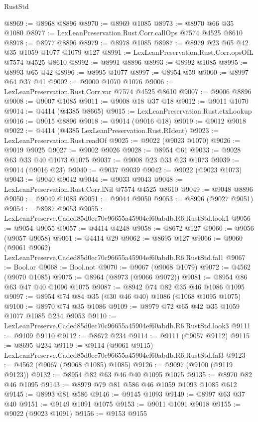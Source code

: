 \begin{lexlean}{RustStd}
\begin{coremodule}
@8969 := @8968 @8896
@8970 := @8969 @1085
@8973 := @8970 @66 @35 @1080
@8977 := LexLeanPreservation.Rust.Corr.callOps @7574 @4525 @8610
@8978 := @8977 @8896
@8979 := @8978 @1085
@8987 := @8979 @23 @65 @42 @35 @1059 @1077 @1079 @127
@8991 := LexLeanPreservation.Rust.Corr.opsOfL @7574 @4525 @8610
@8992 := @8991 @8896
@8993 := @8992 @1085
@8995 := @8993 @65 @42
@8996 := @8995 @1077
@8997 := @8954 @59
@9000 := @8997 @64 @37 @41
@9002 := @9000 @1070 @1076
@9006 := LexLeanPreservation.Rust.Corr.var @7574 @4525 @8610
@9007 := @9006 @8896
@9008 := @9007 @1085
@9011 := @9008 @18 @37 @18
@9012 := @9011 @1070
@9014 := @4414 (@4385 @8665)
@9015 := LexLeanPreservation.Rust.ctxLookup
@9016 := @9015 @8896
@9018 := @9014 (@9016 @18)
@9019 := @9012 @9018
@9022 := @4414 (@4385 LexLeanPreservation.Rust.RIdent)
@9023 := LexLeanPreservation.Rust.readOf
@9025 := @9022 (@9023 @1070)
@9026 := @9019 @9025
@9027 := @9002 @9026
@9028 := @8954 @61
@9033 := @9028 @63 @33 @40 @1073 @1075
@9037 := @9008 @23 @33 @23 @1073
@9039 := @9014 (@9016 @23)
@9040 := @9037 @9039
@9042 := @9022 (@9023 @1073)
@9043 := @9040 @9042
@9044 := @9033 @9043
@9048 := LexLeanPreservation.Rust.Corr.lNil @7574 @4525 @8610
@9049 := @9048 @8896
@9050 := @9049 @1085
@9051 := @9044 @9050
@9053 := @8996 (@9027 @9051)
@9054 := @8987 @9053
@9055 := LexLeanPreserve.Caded85d0ec70c96655a45904ef60abdb.R6.RustStd.look1
@9056 := @9054 @9055
@9057 := @4414 @4248
@9058 := @8672 @127
@9060 := @9056 (@9057 @9058)
@9061 := @4414 @29
@9062 := @8695 @127
@9066 := @9060 (@9061 @9062) LexLeanPreserve.Caded85d0ec70c96655a45904ef60abdb.R6.RustStd.fal1
@9067 := Bool.or
@9068 := Bool.not
@9070 := @9067 (@9068 @1079)
@9072 := @4562 (@9070 @1085)
@9075 := @8964 (@8973 (@9066 @9072))
@9081 := @8954 @86 @63 @47 @40 @1096 @1075
@9087 := @8942 @74 @82 @35 @46 @1086 @1095
@9097 := @8954 @74 @84 @35 (@30 @46 @40) @1086 (@1068 @1095 @1075)
@9100 := @8970 @74 @35 @1086
@9109 := @8979 @72 @65 @42 @35 @1059 @1077 @1085 @234 @9053
@9110 := LexLeanPreserve.Caded85d0ec70c96655a45904ef60abdb.R6.RustStd.look3
@9111 := @9109 @9110
@9112 := @8672 @234
@9114 := @9111 (@9057 @9112)
@9115 := @8695 @234
@9119 := @9114 (@9061 @9115) LexLeanPreserve.Caded85d0ec70c96655a45904ef60abdb.R6.RustStd.fal3
@9123 := @4562 (@9067 (@9068 @1085) @1085)
@9126 := @9097 (@9100 (@9119 @9123))
@9132 := @8954 @82 @63 @46 @40 @1095 @1075
@9135 := @8970 @82 @46 @1095
@9143 := @8979 @79 @81 @586 @46 @1059 @1093 @1085 @612
@9145 := @8993 @81 @586
@9146 := @9145 @1093
@9149 := @8997 @63 @37 @40
@9151 := @9149 @1091 @1075
@9153 := @9011 @1091 @9018
@9155 := @9022 (@9023 @1091)
@9156 := @9153 @9155

\end{coremodule}
\end{lexlean}
